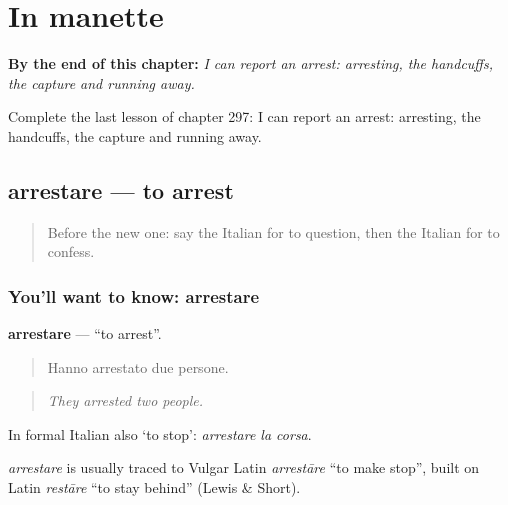 
\chapter{In manette}
\label{ch:it-in-manette}

\begin{chapteropening}
\textbf{By the end of this chapter:} \emph{I can report an arrest: arresting, the handcuffs, the capture and running away.}

Complete the last lesson of chapter 297: I can report an arrest: arresting, the handcuffs, the capture and running away.
\end{chapteropening}

\section[arrestare]{arrestare — to arrest}

\label{lesson:IT-C297-arrestare}



\begin{quote}
Before the new one: say the Italian for to question, then the Italian for to confess.
\end{quote}

\subsection*{You'll want to know: arrestare}
\textbf{arrestare} — \textquotedblleft{}to arrest\textquotedblright{}.

\begin{quote}
Hanno arrestato due persone.
\end{quote}

\begin{quote}
\emph{They arrested two people.}
\end{quote}

In formal Italian also ‘to stop’: \emph{arrestare la corsa}.

\begin{cousinweb}
\emph{arrestare} is usually traced to Vulgar Latin \emph{arrestāre} \textquotedblleft{}to make stop\textquotedblright{}, built on Latin \emph{restāre} \textquotedblleft{}to stay behind\textquotedblright{} (Lewis \& Short).
\end{cousinweb}


